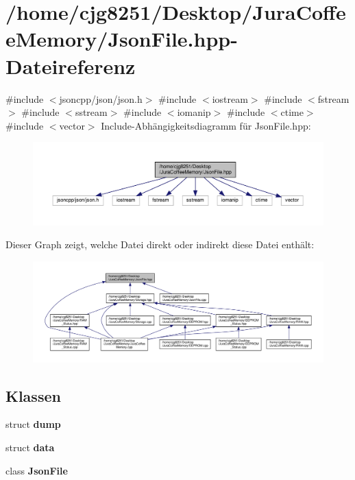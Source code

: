 \section{/home/cjg8251/\+Desktop/\+Jura\+Coffee\+Memory/\+Json\+File.hpp-\/\+Dateireferenz}
\label{_json_file_8hpp}
{\ttfamily \#include $<$jsoncpp/json/json.\+h$>$}\newline
{\ttfamily \#include $<$iostream$>$}\newline
{\ttfamily \#include $<$fstream$>$}\newline
{\ttfamily \#include $<$sstream$>$}\newline
{\ttfamily \#include $<$iomanip$>$}\newline
{\ttfamily \#include $<$ctime$>$}\newline
{\ttfamily \#include $<$vector$>$}\newline
Include-\/\+Abhängigkeitsdiagramm für Json\+File.\+hpp\+:\nopagebreak
\begin{figure}[H]
\begin{center}
\leavevmode
\includegraphics[width=350pt]{_json_file_8hpp__incl}
\end{center}
\end{figure}
Dieser Graph zeigt, welche Datei direkt oder indirekt diese Datei enthält\+:\nopagebreak
\begin{figure}[H]
\begin{center}
\leavevmode
\includegraphics[width=350pt]{_json_file_8hpp__dep__incl}
\end{center}
\end{figure}
\subsection*{Klassen}
\begin{DoxyCompactItemize}
\item 
struct \textbf{ dump}
\item 
struct \textbf{ data}
\item 
class \textbf{ Json\+File}
\end{DoxyCompactItemize}
